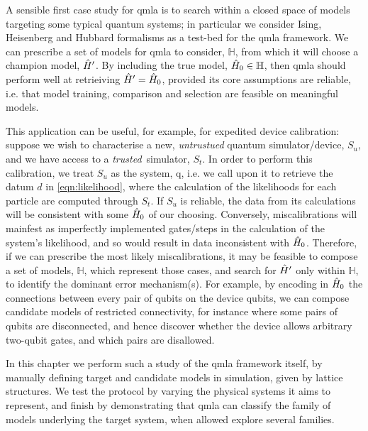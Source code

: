 \glsresetall
A sensible first case study for \gls{qmla} is to search within a closed space of models
    targeting some typical quantum systems; 
    in particular we consider Ising, Heisenberg and Hubbard formalisms as a test-bed for the \gls{qmla} framework. 
We can prescribe a set of models for \gls{qmla} to consider, $\mathbb{H}$,
    from which it will choose a \gls{champion model}, $\hat{H}^{\prime}$.
By including the \gls{true model}, $\hat{H}_0 \in \mathbb{H}$, 
    then \gls{qmla} should perform well at retrieiving $\hat{H}^{\prime}=\hat{H}_0$,
    provided its core assumptions are reliable, 
    i.e. that model training, comparison and selection are 
    feasible on meaningful models.
\par 

This application can be useful, for example, for expedited device calibration:
    suppose we wish to characterise a new, \emph{untrustued} quantum simulator/device, $S_u$, 
    and we have access to a \emph{trusted}\footnotemark \  simulator, $S_t$. 
In order to perform this calibration, 
    we treat $S_u$ as the system, \gls{q}, i.e. we call upon it to retrieve the datum $d$ in \cref{eqn:likelihood}, 
    where the calculation of the \glspl{likelihood}  for each \gls{particle} are computed through $S_t$. 
If $S_u$ is reliable, the data from its calculations will be consistent with some $\hat{H}_0$ of our choosing. 
Conversely, miscalibrations will mainfest as imperfectly implemented gates/steps in the calculation of the system's likelihood, 
    and so would result in data inconsistent with $\hat{H}_0$. 
Therefore, if we can prescribe the most likely miscalibrations, it may be feasible to compose a set 
    of models, $\mathbb{H}$, which represent those cases, and search for $\hat{H}^{\prime}$ only within $\mathbb{H}$,
    to identify the dominant error mechanism(s). 
For example, by encoding in $\hat{H}_0$ the connections between every pair of qubits on the device qubits,
    we can compose candidate models of restricted connectivity, for instance where some pairs of qubits are disconnected, 
    and hence discover whether the device allows arbitrary two-qubit gates, 
    and which pairs are disallowed. 
\par

In this chapter we perform such a study of the \gls{qmla} framework itself, 
    by manually defining target and candidate models in simulation, 
    given by lattice structures.
We test the protocol by varying the physical systems it aims to represent, 
    and finish by demonstrating that \gls{qmla} can classify the family of models 
    underlying the target system, when allowed explore several families.  


